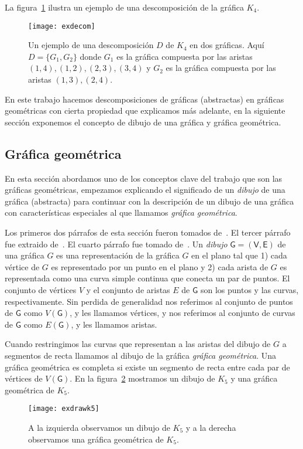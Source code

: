 La figura~\ref{fig:exdecom} ilustra un ejemplo de una descomposición de la gráfica $K_4$.
\begin{figure}[htbp]
  \centering
  \texttt{[image: exdecom]}
  \caption{Un ejemplo de una descomposición $D$ de $K_4$ en dos gráficas.
  Aquí $D=\{G_1,G_2\}$ donde $G_1$ es la gráfica compuesta por las aristas $(1,4),(1,2),(2,3),(3,4)$ y
  $G_2$ es la gráfica compuesta por las aristas $(1,3),(2,4)$.}
  \label{fig:exdecom}
\end{figure}
%
%

En este trabajo hacemos descomposiciones de gráficas (abstractas) en gráficas
geométricas con cierta propiedad que explicamos más adelante, en la siguiente
sección exponemos el concepto de dibujo de una gráfica y gráfica geométrica.
\subsection{Gráfica geométrica}
En esta sección abordamos uno de los conceptos clave del trabajo que son
las gráficas geométricas, empezamos explicando el significado de un
\emph{dibujo} de una gráfica (abstracta) para continuar con la descripción
de un dibujo de una gráfica con características especiales al que llamamos
\emph{gráfica geométrica}.

Los primeros dos párrafos de esta sección fueron tomados de~\cite{Pach2013}. El tercer párrafo
fue extraido de~\cite{Lara2019}. El cuarto párrafo fue tomado de~\cite{Pach2011}.
Un \emph{dibujo} $\mathsf{G}=(\mathsf{V},\mathsf{E})$ de una gráfica $G$ es una representación de la
gráfica $G$ en el plano tal que 1) cada vértice de $G$ es representado por un punto en el plano
y 2) cada arista de $G$ es representada como una curva simple continua que conecta un par de puntos.
El conjunto de vértices $V$ y el conjunto de aristas $E$ de $\mathsf{G}$
son los puntos y las curvas, respectivamente. Sin perdida de generalidad nos referimos al
conjunto de puntos de $\mathsf{G}$ como $V(\mathsf{G})$, y les llamamos vértices, y nos
referimos al conjunto de curvas de $\mathsf{G}$ como $E(\mathsf{G})$, y les llamamos aristas.

Cuando restringimos las curvas que representan a las aristas del dibujo de $G$
a segmentos de recta llamamos al dibujo de la gráfica \emph{gráfica geométrica}.
Una gráfica geométrica es completa si existe un segmento de recta entre cada par de vértices
de $V(\mathsf{G})$. En la figura~\ref{fig:exdrawk5} mostramos un dibujo de $K_5$ y una
gráfica geométrica de $K_5$.
\begin{figure}[htpb]
  \centering
  \texttt{[image: exdrawk5]}
  \caption{A la izquierda observamos un dibujo de $K_5$ y a la derecha observamos
  una gráfica geométrica de $K_5$.}
  \label{fig:exdrawk5}
\end{figure}

